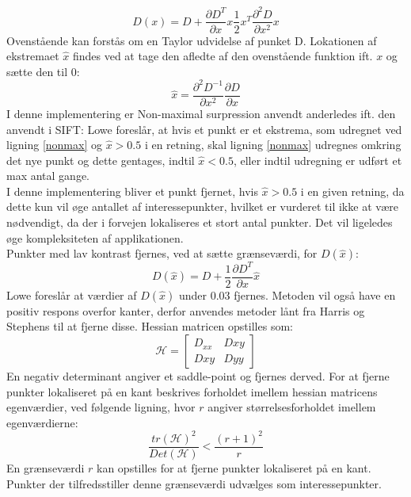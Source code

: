\begin{equation}
D(x)=D+\dfrac{\partial D^T}{\partial x}x\dfrac{1}{2}x^T\dfrac{\partial^2D}{\partial x^2}x
\label{nonmax}
\end{equation}
Ovenstående kan forstås om en Taylor udvidelse af punket D.
Lokationen af ekstremaet $\hat{x}$ findes ved at tage den afledte af den ovenstående funktion ift. $x$ og sætte den til 0:
\begin{equation}
\hat{x}= \dfrac{\partial^2 D^{-1}}{\partial x^2}\dfrac{\partial D}{\partial x}
\label{xhat}
\end{equation}
I denne implementering er Non-maximal surpression anvendt anderledes ift. den anvendt i SIFT: Lowe foreslår, at hvis et punkt er et ekstrema, som udregnet ved ligning \ref{nonmax} og $\hat{x} > 0.5$ i en retning, skal ligning \eqref{nonmax} udregnes omkring det nye punkt og dette gentages, indtil $\hat{x} < 0.5$, eller indtil udregning er udført et max antal gange.
\\
I denne implementering bliver et punkt fjernet, hvis $\hat{x} > 0.5$ i en given retning, da dette kun vil øge antallet af interessepunkter, hvilket er vurderet til ikke at være nødvendigt, da der i forvejen lokaliseres et stort antal punkter. Det vil ligeledes øge kompleksiteten af applikationen.
\\
Punkter med lav kontrast fjernes, ved at sætte grænseværdi, for $D(\hat{x})$:
\begin{equation}
D(\hat{x})=D+\dfrac{1}{2}\dfrac{\partial D^T}{\partial x}\hat{x}
\label{dxhat}
\end{equation}
Lowe foreslår at værdier af $D(\hat{x})$ under 0.03 fjernes. Metoden vil også have en positiv respons overfor kanter, derfor anvendes metoder lånt fra Harris og Stephens \cite{harris} til at fjerne disse. Hessian matricen opstilles som:
\begin{equation}
\mathcal{H} =
\begin{bmatrix}
D_{xx} & D{xy} \\
D{xy} & D{yy}
\end{bmatrix}
\end{equation}
En negativ determinant angiver et saddle-point og fjernes derved. For at fjerne punkter lokaliseret på en kant beskrives forholdet imellem hessian matricens egenværdier, ved følgende ligning, hvor $r$ angiver størrelsesforholdet imellem egenværdierne:
\begin{equation}
\dfrac{tr(\mathcal{H})^2}{Det(\mathcal{H})}<\dfrac{(r+1)^2}{r}
\label{rval}
\end{equation}
En grænseværdi $r$ kan opstilles for at fjerne punkter lokaliseret på en kant. Punkter der tilfredsstiller denne grænseværdi udvælges som interessepunkter.
